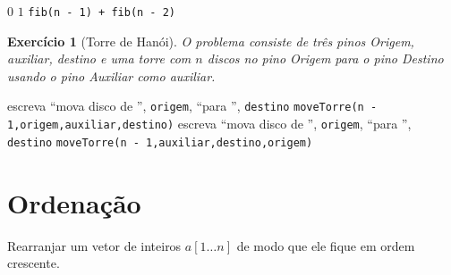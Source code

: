 \documentclass[a4paper]{memoir}
\newtheorem{eex}{Exerc\'icio}
\newcommand{\un}{1 \ldots n}
\begin{document}
\begin{sol}
 
\begin{algorithmic}[1]
    \State \Return $0$
  \Else
      \State \Return $1$
    \Else
      \State \Return \texttt{fib(n - 1) + fib(n - 2)}
    \EndIf
  \EndIf
\EndFunction
\end{algorithmic}

\end{sol}

\begin{eex}[Torre de Hanói]
O problema consiste de três pinos \emph{Origem, auxiliar, destino} e uma torre com $n$ discos no pino \emph{Origem} para o pino \emph{Destino} usando o pino \emph{Auxiliar} como auxiliar.
\end{eex}

\begin{sol}

\begin{algorithmic}[1]
    \State escreva ``mova disco de '', \texttt{origem}, ``para '', \texttt{destino}
  \Else
    \State \texttt{moveTorre(n - 1,origem,auxiliar,destino)}
    \State escreva ``mova disco de '', \texttt{origem}, ``para '', \texttt{destino}
    \State \texttt{moveTorre(n - 1,auxiliar,destino,origem)}
  \EndIf
\EndFunction
\end{algorithmic}

\end{sol}

\newpage 

\section{Ordenação}

\begin{ex}
Rearranjar um vetor de inteiros $a[\un]$ de modo que ele fique em ordem crescente.
\end{ex}
\end{document}
